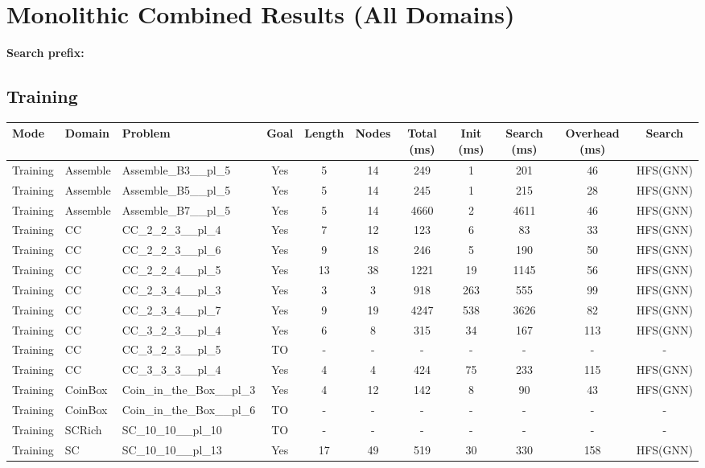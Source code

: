 \documentclass{article}
\begin{document}
\section*{Monolithic Combined Results (All Domains)}
\textbf{Search prefix:} 
\\[0.5cm]
\subsection*{Training}
\begin{tabular}{lllcccccccc}
\toprule
Mode & Domain & Problem & Goal & Length & Nodes & Total (ms) & Init (ms) & Search (ms) & Overhead (ms) & Search \\
\midrule
Training & Assemble & Assemble\_B3\_\_pl\_5 & Yes & 5 & 14 & 249 & 1 & 201 & 46 & HFS(GNN) \\
Training & Assemble & Assemble\_B5\_\_pl\_5 & Yes & 5 & 14 & 245 & 1 & 215 & 28 & HFS(GNN) \\
Training & Assemble & Assemble\_B7\_\_pl\_5 & Yes & 5 & 14 & 4660 & 2 & 4611 & 46 & HFS(GNN) \\
Training & CC & CC\_2\_2\_3\_\_pl\_4 & Yes & 7 & 12 & 123 & 6 & 83 & 33 & HFS(GNN) \\
Training & CC & CC\_2\_2\_3\_\_pl\_6 & Yes & 9 & 18 & 246 & 5 & 190 & 50 & HFS(GNN) \\
Training & CC & CC\_2\_2\_4\_\_pl\_5 & Yes & 13 & 38 & 1221 & 19 & 1145 & 56 & HFS(GNN) \\
Training & CC & CC\_2\_3\_4\_\_pl\_3 & Yes & 3 & 3 & 918 & 263 & 555 & 99 & HFS(GNN) \\
Training & CC & CC\_2\_3\_4\_\_pl\_7 & Yes & 9 & 19 & 4247 & 538 & 3626 & 82 & HFS(GNN) \\
Training & CC & CC\_3\_2\_3\_\_pl\_4 & Yes & 6 & 8 & 315 & 34 & 167 & 113 & HFS(GNN) \\
Training & CC & CC\_3\_2\_3\_\_pl\_5 & TO & - & - & - & - & - & - & - \\
Training & CC & CC\_3\_3\_3\_\_pl\_4 & Yes & 4 & 4 & 424 & 75 & 233 & 115 & HFS(GNN) \\
Training & CoinBox & Coin\_in\_the\_Box\_\_pl\_3 & Yes & 4 & 12 & 142 & 8 & 90 & 43 & HFS(GNN) \\
Training & CoinBox & Coin\_in\_the\_Box\_\_pl\_6 & TO & - & - & - & - & - & - & - \\
Training & SCRich & SC\_10\_10\_\_pl\_10 & TO & - & - & - & - & - & - & - \\
Training & SC & SC\_10\_10\_\_pl\_13 & Yes & 17 & 49 & 519 & 30 & 330 & 158 & HFS(GNN) \\

\end{tabular}
\end{document}

